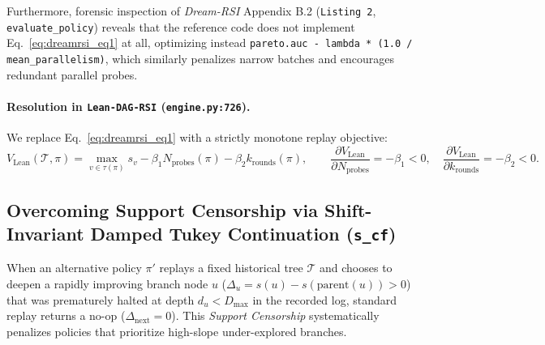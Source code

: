 \documentclass[11pt,a4paper]{article}
\begin{document}
Furthermore, forensic inspection of \emph{Dream-RSI} Appendix B.2 (\texttt{Listing 2}, \texttt{evaluate\_policy}) reveals that the reference code does not implement Eq.~\eqref{eq:dreamrsi_eq1} at all, optimizing instead \texttt{pareto.auc - lambda * (1.0 / mean\_parallelism)}, which similarly penalizes narrow batches and encourages redundant parallel probes.

\paragraph{Resolution in \texttt{Lean-DAG-RSI} (\texttt{engine.py:726}).}
We replace Eq.~\eqref{eq:dreamrsi_eq1} with a strictly monotone replay objective:
\begin{equation}
V_{\text{Lean}}(\mathcal{T}, \pi) = \max_{v \in \tau(\pi)} s_v - \beta_1 N_{\text{probes}}(\pi) - \beta_2 k_{\text{rounds}}(\pi), \qquad \frac{\partial V_{\text{Lean}}}{\partial N_{\text{probes}}} = -\beta_1 < 0, \quad \frac{\partial V_{\text{Lean}}}{\partial k_{\text{rounds}}} = -\beta_2 < 0.
\tag{3}\label{eq:v_lean}
\end{equation}

\subsection{Overcoming Support Censorship via Shift-Invariant Damped Tukey Continuation (\texttt{s\_cf})}

When an alternative policy $\pi'$ replays a fixed historical tree $\mathcal{T}$ and chooses to deepen a rapidly improving branch node $u$ ($\Delta_u = s(u) - s(\text{parent}(u)) > 0$) that was prematurely halted at depth $d_u < D_{\max}$ in the recorded log, standard replay returns a no-op ($\Delta_{\text{next}} = 0$). This \emph{Support Censorship} systematically penalizes policies that prioritize high-slope under-explored branches.
\end{document}
